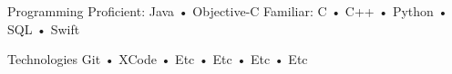 

\begin{cvskills}

  \cvskill
    {Programming} %
    {Proficient: Java • Objective-C \space\space\space Familiar:   C • C++ • Python • SQL • Swift}%

  \cvskill
    {Technologies} %
    {Git • XCode • Etc • Etc • Etc • Etc} %

\end{cvskills}
